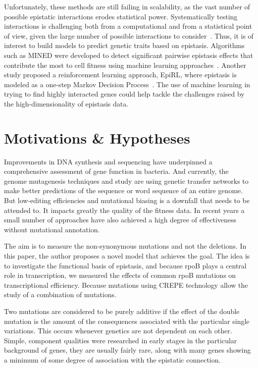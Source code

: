 \documentclass[12pt]{article}
\begin{document}
  Unfortunately, these methods are still failing in scalability, as the vast
  number of possible epistatic interactions erodes statistical power.
  Systematically testing interactions is challenging both from a
  computational and from a statistical point of view, given the large number of
  possible interactions to consider~\cite{slim2019novel}. Thus, it is of
  interest to build models to predict genetic traits based on epistasis.
  Algorithms such as MINED were developed to detect significant pairwise
  epistasis effects that contribute the most to cell
  fitness using machine learning approaches~\cite{he2015mined}. Another study
  proposed a reinforcement learning approach, EpiRL, where epistasis is modeled
  as a one-step Markov Decision Process~\cite{huang2019epirl}. The use of
  machine learning in trying to find highly interacted genes could help tackle
  the challenges raised by the high-dimensionality of epistasis data.

  \section{Motivations \& Hypotheses}

  Improvements in DNA synthesis and sequencing have underpinned a comprehensive
  assessment of gene function in bacteria. And currently, the genome
  mutagenesis techniques and study are using genetic transfer networks to make
  better predictions of the sequence or word sequence of an entire genome. But
  low-editing efficiencies and mutational biasing is a downfall that needs to
  be attended to. It impacts greatly the quality of the fitness data.  In
  recent years a small number of approaches have also achieved a high degree of
  effectiveness without mutational annotation. 

  The aim is to measure the non-synonymous mutations and not the deletions.  In
  this paper, the author proposes a novel model that achieves the goal.  The
  idea is to investigate the functional basis of epistasis, and because rpoB
  plays a central role in transcription, we measured the effects of common rpoB
  mutations on transcriptional efficiency. Because mutations using CREPE
  technology allow the study of a combination of mutations. 

  Two mutations are considered to be purely additive if the effect of the
  double mutation is the amount of the consequences associated with the
  particular single variations. This occurs whenever genetics are not dependent
  on each other. Simple, component qualities were researched in early stages in
  the particular background of genes, they are usually fairly rare, along with
  many genes showing a minimum of some degree of association with the epistatic
  connection.
\end{document}
